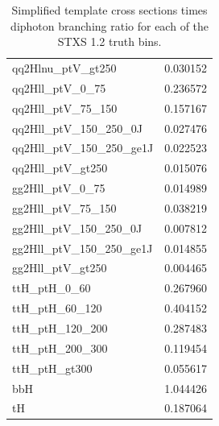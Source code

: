 \begin{table}[htbp]
{\begin{tabular}{lS}
                qq2Hlnu\_ptV\_gt250                                    & 0.030152                                     \\
                qq2Hll\_ptV\_0\_75                                     & 0.236572                                     \\
                qq2Hll\_ptV\_75\_150                                   & 0.157167                                     \\
                qq2Hll\_ptV\_150\_250\_0J                              & 0.027476                                     \\
                qq2Hll\_ptV\_150\_250\_ge1J                            & 0.022523                                     \\
                qq2Hll\_ptV\_gt250                                     & 0.015076                                     \\
                gg2Hll\_ptV\_0\_75                                     & 0.014989                                     \\
                gg2Hll\_ptV\_75\_150                                   & 0.038219                                     \\
                gg2Hll\_ptV\_150\_250\_0J                              & 0.007812                                     \\
                gg2Hll\_ptV\_150\_250\_ge1J                            & 0.014855                                     \\
                gg2Hll\_ptV\_gt250                                     & 0.004465                                     \\
                ttH\_ptH\_0\_60                                        & 0.267960                                     \\
                ttH\_ptH\_60\_120                                      & 0.404152                                     \\
                ttH\_ptH\_120\_200                                     & 0.287483                                     \\
                ttH\_ptH\_200\_300                                     & 0.119454                                     \\
                ttH\_ptH\_gt300                                        & 0.055617                                     \\
                bbH                                                    & 1.044426                                     \\
                tH                                                     & 0.187064                                     \\
                \bottomrule
        \end{tabular}
        }
        \caption{Simplified template cross sections times diphoton branching ratio for each of the STXS 1.2 truth bins.}
        \label{tab:STXS_cross_sections}
\end{table}


